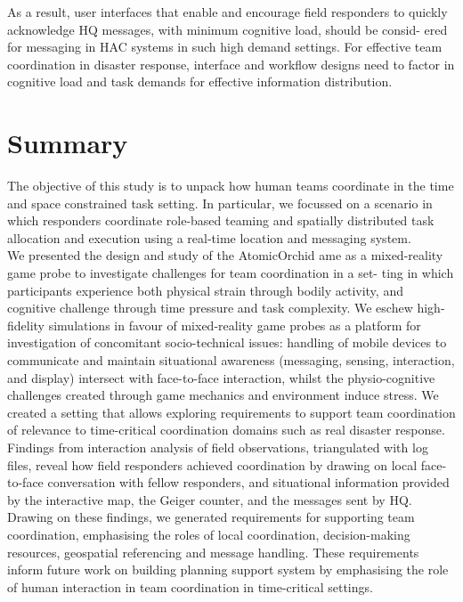 As a result, user interfaces that enable and encourage field responders to quickly acknowledge HQ messages, with minimum cognitive load, should be consid- ered for messaging in HAC systems in such high demand settings. For effective team coordination in disaster response, interface and workflow designs need to factor in cognitive load and task demands for effective information distribution.\\


\section{Summary}
The objective of this study is to unpack how human teams coordinate in the time and space constrained task setting. In particular, we focussed on a scenario in which responders coordinate role-based teaming and spatially distributed task allocation and execution using a real-time location and messaging system.\\

We presented the design and study of the AtomicOrchid ame as a mixed-reality game probe to investigate challenges for team coordination in a set- ting in which participants experience both physical strain through bodily activity, and cognitive challenge through time pressure and task complexity. We eschew high-fidelity simulations in favour of mixed-reality game probes as a platform for investigation of concomitant socio-technical issues: handling of mobile devices to communicate and maintain situational awareness (messaging, sensing, interaction, and display) intersect with face-to-face interaction, whilst the physio-cognitive challenges created through game mechanics and environment induce stress. We created a setting that allows exploring requirements to support team coordination of relevance to time-critical coordination domains such as real disaster response.\\

Findings from interaction analysis of field observations, triangulated with log files, reveal how field responders achieved coordination by drawing on local face-to-face conversation with fellow responders, and situational information provided by the interactive map, the Geiger counter, and the messages sent by HQ. Drawing on these findings, we generated requirements for supporting team coordination, emphasising the roles of local coordination, decision-making resources, geospatial referencing and message handling. These requirements inform future work on building planning support system by emphasising the role of human interaction in team coordination in time-critical settings.\\

